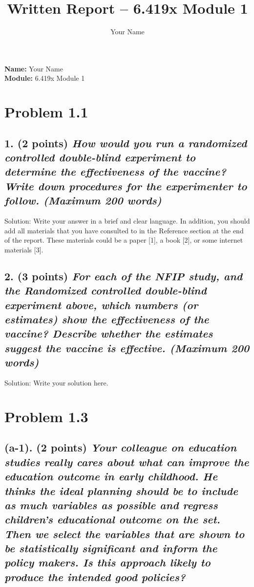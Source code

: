 \documentclass[12pt]{article}
\title{Written Report – 6.419x Module 1}
\author{Your Name}
\date{}
\begin{document}
\maketitle

\noindent \textbf{Name:} Your Name \\
\noindent \textbf{Module:} 6.419x Module 1

\section*{Problem 1.1}

\subsection*{1. (2 points) \textit{How would you run a randomized controlled double-blind experiment to determine the effectiveness of the vaccine? Write down procedures for the experimenter to follow. (Maximum 200 words)}}

Solution: Write your answer in a brief and clear language. In addition, you should add all materials that you have consulted to in the Reference section at the end of the report. These materials could be a paper [1], a book [2], or some internet materials [3].

\subsection*{2. (3 points) \textit{For each of the NFIP study, and the Randomized controlled double-blind experiment above, which numbers (or estimates) show the effectiveness of the vaccine? Describe whether the estimates suggest the vaccine is effective. (Maximum 200 words)}}

Solution: Write your solution here.

\section*{Problem 1.3}

\subsection*{(a-1). (2 points) \textit{Your colleague on education studies really cares about what can improve the education outcome in early childhood. He thinks the ideal planning should be to include as much variables as possible and regress children's educational outcome on the set. Then we select the variables that are shown to be statistically significant and inform the policy makers. Is this approach likely to produce the intended good policies?}}
\end{document}
